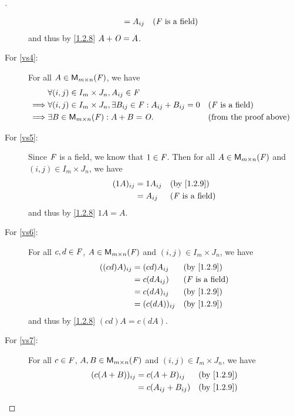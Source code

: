 \begin{proof}[]
\begin{description}
\begin{align*}
                        & = A_{i j}             &  & \text{(\(\mathit{F}\) is a field)}
      \end{align*}
      and thus by \cref{1.2.8} \(A + \mathit{O} = A\).
    \item[For \ref{vs4}:]
      For all \(A \in \ms\), we have
      \begin{align*}
                 & \forall (i, j) \in I_m \times J_n, A_{i j} \in \F                                                                    \\
        \implies & \forall (i, j) \in I_m \times J_n, \exists B_{i j} \in \F : A_{i j} + B_{i j} = 0 &  & \text{(\(\F\) is a field)}    \\
        \implies & \exists B \in \ms : A + B = \zm.                                                  &  & \text{(from the proof above)}
      \end{align*}
    \item[For \ref{vs5}:]
      Since \(\mathit{F}\) is a field, we know that \(1 \in \mathit{F}\).
      Then for all \(A \in \ms\) and \((i, j) \in I_m \times J_n\), we have
      \begin{align*}
        (1A)_{i j} & = 1 A_{i j} &  & \by{1.2.9}                 \\
                   & = A_{i j}   &  & \text{(\(\F\) is a field)}
      \end{align*}
      and thus by \cref{1.2.8} \(1A = A\).
    \item[For \ref{vs6}:]
      For all \(c, d \in \mathit{F}\), \(A \in \ms\) and \((i, j) \in I_m \times J_n\), we have
      \begin{align*}
        ((cd) A)_{i j} & = (cd) A_{i j}    &  & \by{1.2.9}                 \\
                       & = c (d A_{i j})   &  & \text{(\(\F\) is a field)} \\
                       & = c (d A)_{i j}   &  & \by{1.2.9}                 \\
                       & = (c (d A))_{i j} &  & \by{1.2.9}
      \end{align*}
      and thus by \cref{1.2.8} \((cd) A = c (dA)\).
    \item[For \ref{vs7}:]
      For all \(c \in \mathit{F}\), \(A, B \in \ms\) and \((i, j) \in I_m \times J_n\), we have
      \begin{align*}
        (c (A + B))_{i j} & = c (A + B)_{i j}         &  & \by{1.2.9}                 \\
                          & = c (A_{i j} + B_{i j})   &  & \by{1.2.9}                 \\

\end{align*}
\end{description}
\end{proof}
